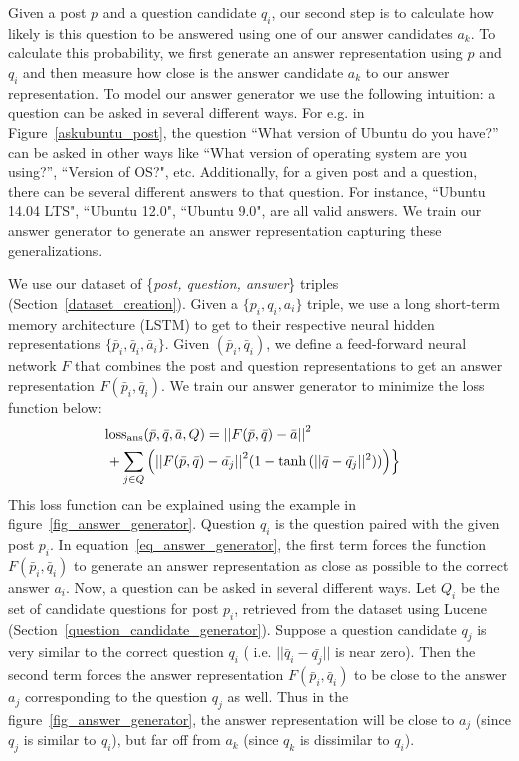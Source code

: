 \documentclass[11pt]{report}
\renewcommand\cite{\citep}	%
\begin{document}
Given a post $p$ and a question candidate $q_i$, our second step is to calculate how likely is this question to be answered using one of our answer candidates $a_k$. To calculate this probability, we first generate an answer representation using $p$ and $q_i$ and then measure how close is the answer candidate $a_k$ to our answer representation. To model our answer generator we use the following intuition: a question can be asked in several different ways. For e.g. in Figure~\ref{askubuntu_post}, the question ``\textsf{\small What version of Ubuntu do you have?}'' can be asked in other ways like ``\textsf{\small What version of operating system are you using?}'', ``\textsf{\small Version of OS?}", etc.  
Additionally, for a given post and a question, there can be several different answers to that question. For instance, ``\textsf{\small Ubuntu 14.04 LTS}", ``\textsf{\small Ubuntu 12.0}", ``\textsf{\small Ubuntu 9.0}", are all valid answers. We train our answer generator to generate an answer representation capturing these generalizations.

We use our dataset of \{\textit{post, question, answer}\} triples (Section~\ref{dataset_creation}). Given a $\{p_i, q_i, a_i\}$ triple, we use a long short-term memory architecture (LSTM) \cite{hochreiter1997long} to get to their respective neural hidden representations $\{\bar p_i, \bar q_i, \bar a_i\}$.  Given $(\bar p_i, \bar q_i)$, we define a feed-forward neural network $F$ that combines the post and question representations to get an answer representation $F(\bar p_i, \bar q_i)$. We train our answer generator to minimize the loss function below:
%
\begin{align}\label{eq_answer_generator}
  \textrm{loss}_{\textrm{ans}}(\bar p, \bar q, \bar a, Q) 
  &=  {|| F(\bar p, \bar q) - \bar a||}^2 & \\
  &\hspace{-25mm} +  \sum_{j \in Q} \Big ( {|| F(\bar p, \bar q) - \bar{a_j} ||}^2  (1 - \tanh{(|| \bar q - \bar{q_j} ||^2)}) \Big ) \Big \} &\nonumber
\end{align}
%
This loss function can be explained using the example in figure~\ref{fig_answer_generator}. Question $q_i$ is the question paired with the given post $p_i$. In equation~\ref{eq_answer_generator}, the first term forces the function $F(\bar p_i, \bar q_i)$ to generate an answer representation as close as possible to the correct answer $a_i$. Now, a question can be asked in several different ways. Let $Q_i$ be the set of candidate questions for post $p_i$, retrieved from the dataset using Lucene (Section~\ref{question_candidate_generator}). Suppose a question candidate $q_j$ is very similar to the correct question $q_i$ ( i.e. $|| \bar q_i - \bar{q_j} ||$ is near zero). Then the second term forces the answer representation $F(\bar p_i, \bar q_i)$ to be close to the answer $a_j$ corresponding to the question $q_j$ as well. Thus in the figure~\ref{fig_answer_generator}, the answer representation will be close to $a_j$ (since $q_j$ is similar to $q_i$), but far off from $a_k$ (since $q_k$ is dissimilar to $q_i$).
\end{document}
